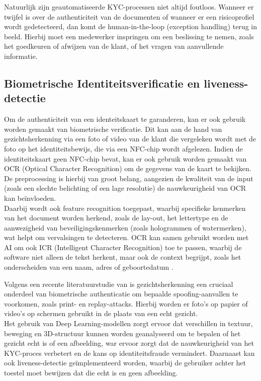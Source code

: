 Natuurlijk zijn geautomatiseerde KYC-processen niet altijd foutloos. Wanneer er twijfel is over de authenticiteit van de documenten of wanneer er een risicoprofiel wordt gedetecteerd, 
dan komt de human-in-the-loop (exception handling) terug in beeld. Hierbij moet een medewerker inspringen om een beslissing te nemen, zoals het goedkeuren of afwijzen van de klant, of het vragen van aanvullende informatie.

\subsection{Biometrische Identiteitsverificatie en liveness-detectie}
Om de authenticiteit van een identeitskaart te garanderen, kan er ook gebruik worden gemaakt van biometrische verificatie.
Dit kan aan de hand van gezichtsherkenning via een foto of video van de klant die vergeleken wordt met de foto op het identiteitsbewijs, die via
een NFC-chip wordt afgelezen. Indien de identiteitskaart geen NFC-chip bevat, kan er ook gebruik worden gemaakt van OCR (Optical Character Recognition) om de gegevens van de kaart te bekijken.
De preprocessing is hierbij van groot belang, aangezien de kwaliteit van de input (zoals een slechte belichting of een lage resolutie) de nauwkeurigheid van OCR kan beïnvloeden. 
\\ Daarbij wordt ook feature recognition toegepast, waarbij specifieke kenmerken van het document worden herkend, zoals de lay-out, het lettertype en de aanwezigheid van beveiligingskenmerken (zoals hologrammen of watermerken), wat helpt om vervalsingen te detecteren.
OCR kan samen gebruikt worden met AI om ook ICR (Intelligent Character Recognition) toe te passen, waarbij de software niet alleen de tekst herkent, maar ook de context begrijpt, 
zoals het onderscheiden van een naam, adres of geboortedatum \autocite{IBM_OCR_2024}.

Volgens een recente literatuurstudie van \autocite{FaceLivenessMDPI2023} is gezichtsherkenning een cruciaal onderdeel van biometrische authenticatie
om bepaalde spoofing-aanvallen te voorkomen, zoals print- en replay-attacks. Hierbij worden er foto's op papier of video's op schermen gebruikt in de plaats van een echt gezicht. \\
Het gebruik van Deep Learning-modellen zorgt ervoor dat verschillen in textuur, beweging en 3D-structuur kunnen worden geanalyseerd om te bepalen of het gezicht echt is of een afbeelding, 
war ervoor zorgt dat de nauwkeurigheid van het KYC-proces verbetert en de kans op identiteitsfraude vermindert. Daarnaast kan ook liveness-detectie geïmplementeerd worden, waarbij de gebruiker achter het toestel
moet bewijzen dat die echt is en geen afbeelding.

